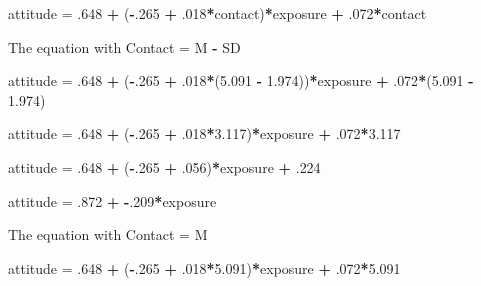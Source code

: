\documentclass[a4paper]{book}
\newenvironment{Shaded}{\begin{snugshade}}{\end{snugshade}}
\newcommand{\DecValTok}[1]{\textcolor[rgb]{0.00,0.00,0.00}{#1}}
\newcommand{\FloatTok}[1]{\textcolor[rgb]{0.00,0.00,0.00}{#1}}
\newcommand{\StringTok}[1]{\textcolor[rgb]{0.00,0.00,0.00}{#1}}
\newcommand{\OperatorTok}[1]{\textcolor[rgb]{0.00,0.00,0.00}{\textbf{#1}}}
\newcommand{\NormalTok}[1]{#1}
\theoremstyle{definition}
\theoremstyle{definition}
\theoremstyle{definition}
\theoremstyle{remark}
\begin{document}
\begin{Shaded}
\begin{Highlighting}[]
\NormalTok{attitude =}\StringTok{ }\NormalTok{.}\DecValTok{648} \OperatorTok{+}\StringTok{ }\NormalTok{(}\OperatorTok{-}\NormalTok{.}\DecValTok{265} \OperatorTok{+}\StringTok{ }\NormalTok{.}\DecValTok{018}\OperatorTok{*}\NormalTok{contact)}\OperatorTok{*}\NormalTok{exposure }\OperatorTok{+}\StringTok{ }\NormalTok{.}\DecValTok{072}\OperatorTok{*}\NormalTok{contact  }
  
\NormalTok{The equation with Contact =}\StringTok{ }\NormalTok{M }\OperatorTok{-}\StringTok{ }\NormalTok{SD  }
  
\NormalTok{attitude =}\StringTok{ }\NormalTok{.}\DecValTok{648} \OperatorTok{+}\StringTok{ }\NormalTok{(}\OperatorTok{-}\NormalTok{.}\DecValTok{265} \OperatorTok{+}\StringTok{ }\NormalTok{.}\DecValTok{018}\OperatorTok{*}\NormalTok{(}\FloatTok{5.091} \OperatorTok{-}\StringTok{ }\FloatTok{1.974}\NormalTok{))}\OperatorTok{*}\NormalTok{exposure }\OperatorTok{+}\StringTok{ }\NormalTok{.}\DecValTok{072}\OperatorTok{*}\NormalTok{(}\FloatTok{5.091} \OperatorTok{-}\StringTok{ }\FloatTok{1.974}\NormalTok{)  }
  
\NormalTok{attitude =}\StringTok{ }\NormalTok{.}\DecValTok{648} \OperatorTok{+}\StringTok{ }\NormalTok{(}\OperatorTok{-}\NormalTok{.}\DecValTok{265} \OperatorTok{+}\StringTok{ }\NormalTok{.}\DecValTok{018}\OperatorTok{*}\FloatTok{3.117}\NormalTok{)}\OperatorTok{*}\NormalTok{exposure }\OperatorTok{+}\StringTok{ }\NormalTok{.}\DecValTok{072}\OperatorTok{*}\FloatTok{3.117}  
  
\NormalTok{attitude =}\StringTok{ }\NormalTok{.}\DecValTok{648} \OperatorTok{+}\StringTok{ }\NormalTok{(}\OperatorTok{-}\NormalTok{.}\DecValTok{265} \OperatorTok{+}\StringTok{ }\NormalTok{.}\DecValTok{056}\NormalTok{)}\OperatorTok{*}\NormalTok{exposure }\OperatorTok{+}\StringTok{ }\NormalTok{.}\DecValTok{224}  
  
\NormalTok{attitude =}\StringTok{ }\NormalTok{.}\DecValTok{872} \OperatorTok{+}\StringTok{ }\OperatorTok{-}\NormalTok{.}\DecValTok{209}\OperatorTok{*}\NormalTok{exposure  }
  
\NormalTok{The equation with Contact =}\StringTok{ }\NormalTok{M  }
  
\NormalTok{attitude =}\StringTok{ }\NormalTok{.}\DecValTok{648} \OperatorTok{+}\StringTok{ }\NormalTok{(}\OperatorTok{-}\NormalTok{.}\DecValTok{265} \OperatorTok{+}\StringTok{ }\NormalTok{.}\DecValTok{018}\OperatorTok{*}\FloatTok{5.091}\NormalTok{)}\OperatorTok{*}\NormalTok{exposure }\OperatorTok{+}\StringTok{ }\NormalTok{.}\DecValTok{072}\OperatorTok{*}\FloatTok{5.091}  
  

\end{Highlighting}
\end{Shaded}
\end{document}
